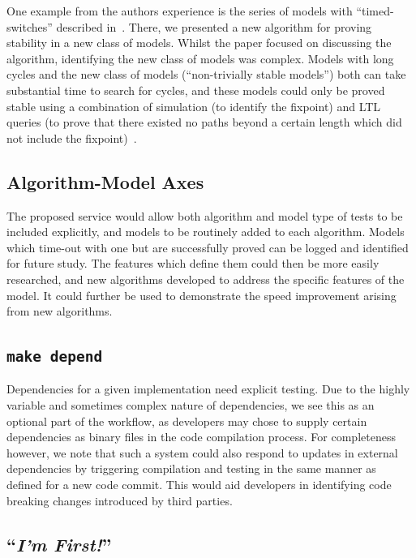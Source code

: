 \documentclass[conference]{IEEEtran}
\begin{document}
One example from the authors experience is the series of models with
``timed-switches'' described in~\cite{cook-et-al:2014}. There, we
presented a new algorithm for proving stability in a new class of
models. Whilst the paper focused on discussing the algorithm,
identifying the new class of models was complex. Models with long
cycles and the new class of models (``non-trivially stable models'')
both can take substantial time to search for cycles, and these models
could only be proved stable using a combination of simulation (to
identify the fixpoint) and LTL queries (to prove that there existed
no paths beyond a certain length which did not include the
fixpoint)~\cite{claessen-et-al:2013}.

\subsection{Algorithm-Model Axes}

The proposed service would allow both algorithm and model type of
tests to be included explicitly, and models to be routinely added to
each algorithm. Models which time-out with one but are successfully
proved can be logged and identified for future study. The features
which define them could then be more easily researched, and new algorithms
developed to address the specific features of the model. It could
further be used to demonstrate the speed improvement arising from new
algorithms.

\subsection{{\texttt{make depend}}}

Dependencies for a given implementation need explicit testing. Due to
the highly variable and sometimes complex nature of dependencies, we
see this as an optional part of the workflow, as developers may chose
to supply certain dependencies as binary files in the code compilation
process. For completeness however, we note that such a system could
also respond to updates in external dependencies by triggering
compilation and testing in the same manner as defined for a new code
commit. This would aid developers in identifying code breaking changes
introduced by third parties.

\subsection{``{\emph{I'm First!}}''}
\end{document}
